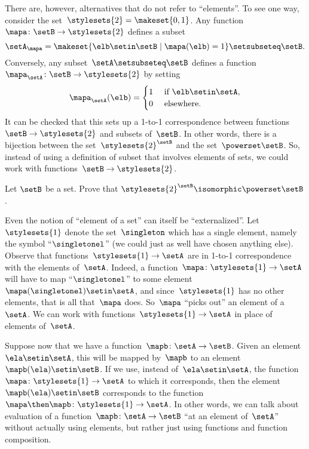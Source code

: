 There are, however, alternatives that do not refer to ``elements''.
To see one way, consider the set~$\stylesets{2} = \makeset{ 0, 1}$.
Any function~$\mapa \colon \setB \to \stylesets{2}$ defines a subset
\begin{equation*}
    \setA_\mapa = \makeset{ \elb \setin\setB \mid \mapa(\elb) = 1 } \setsubseteq \setB.
\end{equation*}
Conversely, any subset~$\setA \setsubseteq \setB$ defines a function~$\mapa_\setA \colon \setB \to \stylesets{2}$ by setting
\begin{equation*}
    \mapa_\setA(\elb) = \begin{cases}
        1 & \text{ if }\elb\setin\setA, \\
        0 & \text{ elsewhere}.
    \end{cases}
\end{equation*}
It can be checked that this sets up a 1-to-1 correspondence between functions~$\setB \to \stylesets{2}$ and subsets of~$\setB$.
In other words, there is a bijection between the set~$\stylesets{2}^\setB$ and the set~$\powerset \setB$.
So, instead of using a definition of subset that involves elements of sets, we could work with functions~$\setB \to \stylesets{2}$.

\begin{gradedexercise}
    \label{ex:SubsetsAsFunctions}

    Let $\setB$ be a set.
    Prove that $\stylesets{2}^\setB \isomorphic \powerset \setB$.
\end{gradedexercise}


Even the notion of ``element of a set'' can itself be ``externalized''.
Let~$\stylesets{1}$ denote the set~$\singleton$ which has a single element, namely the symbol ``$\singletonel$'' (we could just as well have chosen anything else).
Observe that functions~$\stylesets{1} \to \setA$ are in 1-to-1 correspondence with the elements of~$\setA$.
Indeed, a function~$\mapa\colon \stylesets{1} \to \setA$ will have to map ``$\singletonel$'' to some element~$\mapa(\singletonel) \setin\setA$, and since~$\stylesets{1}$ has no other elements, that is all that~$\mapa$ does.
So~$\mapa$ ``picks out'' an element of a~$\setA$.
We can work with functions~$\stylesets{1} \to \setA$ in place of elements of~$\setA$.

Suppose now that we have a function~$\mapb \colon \setA \to \setB$.
Given an element~$\ela \setin\setA$, this will be mapped by~$\mapb$ to an element~$\mapb(\ela) \setin\setB$.
If we use, instead of~$\ela \setin\setA$, the function~$\mapa \colon \stylesets{1} \to \setA$ to which it corresponds, then the element~$\mapb(\ela) \setin\setB$ corresponds to the function~$\mapa \then \mapb\colon \stylesets{1} \to \setA$.
In other words, we can talk about evaluation of a function~$\mapb \colon \setA \to \setB$ ``at an element of~$\setA$'' without actually using elements, but rather just using functions and function composition.

